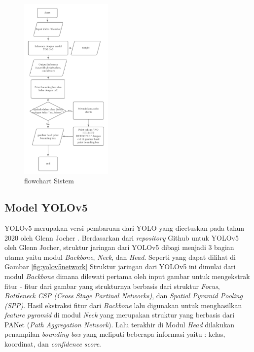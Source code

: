 \begin{figure} [ht]
  \centering
  \includegraphics[width=0.4\textwidth]{gambar/flowchart_sistem.png}

  \caption{flowchart Sistem}
  \label{fig:flowchart_sistem}
\end{figure}

\subsection{Model YOLOv5}
\label{subsec:yolov5model}

YOLOv5 merupakan versi pembaruan dari YOLO yang dicetuskan pada tahun 2020 oleh Glenn Jocher \cite{glenn_jocher_yolov5}. Berdasarkan dari \emph{repository} Github untuk YOLOv5 oleh Glenn Jocher, struktur jaringan dari YOLOv5 dibagi menjadi 3 bagian utama yaitu modul \emph{Backbone}, \emph{Neck}, dan \emph{Head}.
Seperti yang dapat dilihat di Gambar \ref{fig:yolov5network} Struktur jaringan dari YOLOv5 ini dimulai dari modul \emph{Backbone} dimana dilewati pertama oleh input gambar untuk mengekstrak fitur - fitur dari gambar yang strukturnya berbasis dari struktur \emph{Focus}, \emph{Bottleneck CSP (Cross Stage Partinal Networks)}, dan \emph{Spatial Pyramid Pooling (SPP)}.
Hasil ekstraksi fitur dari \emph{Backbone} lalu digunakan untuk menghasilkan \emph{feature pyramid} di modul \emph{Neck} yang merupakan struktur yang berbasis dari PANet (\emph{Path Aggregation Network}).
Lalu terakhir di Modul \emph{Head} dilakukan penampilan \emph{bounding box} yang meliputi beberapa informasi yaitu : kelas, koordinat, dan \emph{confidence score}.


